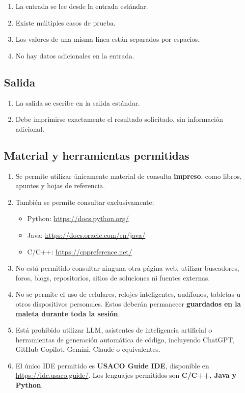 \documentclass[10pt,letterpaper]{article}
\begin{document}
\begin{enumerate}[leftmargin=*]
  \item La entrada se lee desde la entrada estándar.
  \item Existe múltiples casos de prueba.
  \item Los valores de una misma línea están separados por espacios.
  \item No hay datos adicionales en la entrada.
\end{enumerate}

\subsection*{Salida}

\begin{enumerate}[leftmargin=*]
  \item La salida se escribe en la salida estándar.
  \item Debe imprimirse exactamente el resultado solicitado, sin información adicional.
\end{enumerate}


\subsection*{Material y herramientas permitidas}

\begin{enumerate}[leftmargin=*]
  \item Se permite utilizar únicamente material de consulta \textbf{impreso}, como libros, apuntes y hojas de referencia.
  \item También se permite consultar exclusivamente:
        \begin{itemize}
          \item Python: \url{https://docs.python.org/}
          \item Java: \url{https://docs.oracle.com/en/java/}
          \item C/C++: \url{https://cppreference.net/}
        \end{itemize}
  \item No está permitido consultar ninguna otra página web, utilizar buscadores, foros, blogs, repositorios, sitios de soluciones ni fuentes externas.
  \item No se permite el uso de celulares, relojes inteligentes, audífonos, tabletas u otros dispositivos personales. Estos deberán permanecer \textbf{guardados en la maleta durante toda la sesión}.
  \item Está prohibido utilizar LLM, asistentes de inteligencia artificial o herramientas de generación automática de código, incluyendo ChatGPT, GitHub Copilot, Gemini, Claude o equivalentes.
  \item El único IDE permitido es \textbf{USACO Guide IDE}, disponible en \url{https://ide.usaco.guide/}. Los lenguajes permitidos son \textbf{C/C++, Java y Python}.
\end{enumerate}
\end{document}
